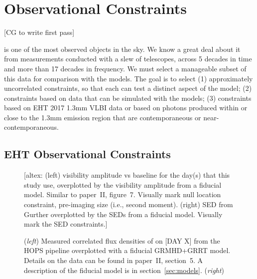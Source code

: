\section{Observational Constraints}\label{sec:observations}

[CG to write first pass]

\sgra is one of the most observed objects in the sky.
We know a great deal about it from measurements conducted with a slew
of telescopes, across 5 decades in time and more than 17 decades in
frequency.
We must select a manageable subset of this data for comparison with
the models.
The goal is to select
(1) approximately uncorrelated constraints, so that each can test a
distinct aspect of the model;
(2) constraints based on data that can be simulated with the models;
(3) constraints based on EHT 2017 1.3mm VLBI data or based on photons
produced within or close to the 1.3mm emission region that are
contemporaneous or near-contemporaneous.


\subsection{EHT Observational Constraints}


\begin{figure*}
  \centering
  [altex: (left) visibility amplitude vs baseline for the day(s) that
    this study use, overplotted by the visibility amplitude from a
    fiducial model.
    Similar to paper~II, figure~7.
    Visually mark null location constraint, pre-imaging size (i.e.,
    second moment).
    (right) SED from Gurther overplotted by the SEDs from a fiducial
    model.
    Visually mark the SED constraints.]
  \caption{(\emph{left}) Measured correlated flux densities of \sgra
    on [DAY X] from the HOPS pipeline overplotted with a fiducial
    GRMHD+GRRT model.
    Details on the data can be found in paper~II, section~5.
    A description of the fiducial model is in
    section~\ref{sec:models}.
    (\emph{right}) }
  \label{fig:visibility}
\end{figure*}


